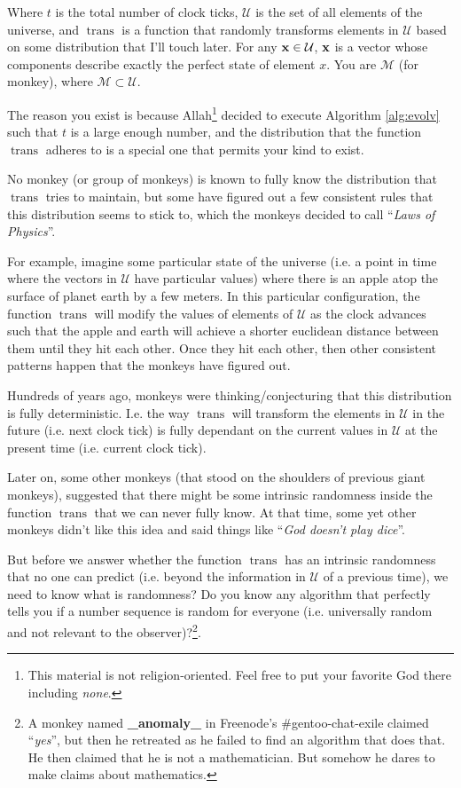 \documentclass{report}
\DeclareMathOperator{\trans}{trans}
\begin{document}
Where $t$ is the total number of clock ticks, $\mathcal{U}$ is the set of all
elements of the universe, and $\trans$ is a function that randomly transforms
elements in $\mathcal{U}$ based on some distribution that I'll touch later. For
any $\bf{x} \in \mathcal{U}$, $\bf{x}$ is a vector whose components describe
exactly the perfect state of element $x$. You are $\mathcal{M}$ (for monkey),
where $\mathcal{M} \subset \mathcal{U}$.

The reason you exist is because Allah\footnote{This material is not
religion-oriented. Feel free to put your favorite God there including
\emph{none}.} decided to execute Algorithm \ref{alg:evolv} such that $t$ is a
large enough number, and the distribution that the function $\trans$
adheres to is a special one that permits your kind to exist.

No monkey (or group of monkeys) is known to fully know the distribution that
$\trans$ tries to maintain, but some have figured out a few consistent
rules that this distribution seems to stick to, which the monkeys decided to
call ``\emph{Laws of Physics}''.

For example, imagine some particular state of the universe (i.e. a point in
time where the vectors in $\mathcal{U}$ have particular values) where there is an apple
atop the surface of planet earth by a few meters. In this particular
configuration, the function $\trans$ will modify the values of elements of
$\mathcal{U}$ as the clock advances such that the apple and earth will achieve a shorter
euclidean distance between them until they hit each other. Once they hit each
other, then other consistent patterns happen that the monkeys have figured out.

Hundreds of years ago, monkeys were thinking/conjecturing that
this distribution is fully deterministic. I.e. the way $\trans$ will
transform the elements in $\mathcal{U}$ in the future (i.e. next clock tick) is fully
dependant on the current values in $\mathcal{U}$ at the present time (i.e. current clock
tick).

Later on, some other monkeys (that stood on the shoulders of previous giant
monkeys), suggested that there might be some intrinsic randomness inside the
function $\trans$ that we can never fully know. At that time, some yet
other monkeys didn't like this idea and said things like ``\emph{God doesn't
play dice}''.

But before we answer whether the function $\trans$ has an intrinsic
randomness that no one can predict (i.e. beyond the information in $\mathcal{U}$ of a
previous time), we need to know what is randomness? Do you know any algorithm
that perfectly tells you if a number sequence is random for everyone (i.e.
universally random and not relevant to the observer)?\footnote{A monkey named
\textbf{\_anomaly\_} in Freenode's \#gentoo-chat-exile claimed ``\emph{yes}'',
but then he retreated as he failed to find an algorithm that does that. He then
claimed that he is not a mathematician. But somehow he dares to make claims
about mathematics.}.
\end{document}
